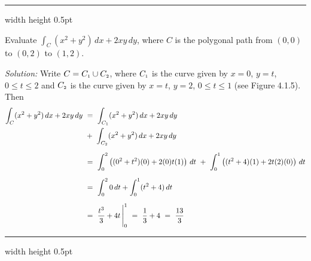 \vspace{3mm}
\hrule width \textwidth height 0.5pt
\begin{exmp}\label{exmp:lineintexmppoly}
 Evaluate $\int_C (x^2 + y^2 )\,dx + 2xy\,dy$, where $C$ is the polygonal path from $(0,0)$ to $(0,2)$ to
 $(1,2)$.\vspace{1mm}

 \piccaption[]{}
 \par\noindent \emph{Solution:} Write $C = C_{\scriptscriptstyle 1} \cup C_{\scriptscriptstyle 2}$, where $C_{\scriptscriptstyle 1}$ is the curve given by
 $x=0$, $y=t$, $0 \le t \le 2$ and $C_{\scriptscriptstyle 2}$ is the curve given by $x=t$, $y=2$, $0 \le t \le 1$ (see Figure
 4.1.5). Then
 \begin{align*}
  \int_C (x^2 + y^2 )\,dx + 2xy\,dy ~&=~ \int_{C_{\scriptscriptstyle 1}} (x^2 + y^2 )\,dx + 2xy\,dy\\
   &+~ \int_{C_{\scriptscriptstyle 2}} (x^2 + y^2 )\,dx + 2xy\,dy\\[6pt]
   &=~ \int_0^2 \left( (0^2 + t^2 )(0) + 2(0)t(1) \right) \,dt ~+~
    \int_0^1 \left( (t^2 + 4 )(1) + 2t(2)(0) \right) \,dt\\[6pt]
   &=~ \int_0^2 0\,dt + \int_0^1 (t^2 + 4 )\,dt\\[6pt]
   &=~ \frac{t^3}{3} + 4t \,\Bigg|_0^1 ~=~ \frac{1}{3} + 4 ~=~ \frac{13}{3}
 \end{align*}
\end{exmp}
\hrule width \textwidth height 0.5pt
\vspace{3mm}


